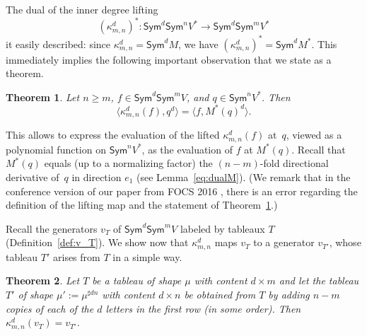 \documentclass[11pt]{amsart}
\def\Sym{\mathsf{Sym}}
\numberwithin{equation}{section}
\newtheorem{theorem}{Theorem}[section]
\begin{document}
The dual of the inner degree lifting
$$
 (\kappa^d_{m,n})^*\colon \Sym^d\Sym^n V^* \to \Sym^d\Sym^m V^*
$$
it easily described: since $\kappa^d_{m,n} =\Sym^d M$, we have 
$(\kappa^d_{m,n})^* =\Sym^d M^*$. 
This immediately implies the following important observation that we 
state as a theorem. 

\begin{theorem}\label{th:lift-ip-preserv}
Let $n\ge m$, $f\in\Sym^d\Sym^m V$, and $q\in\Sym^n V^*$. Then
$$
\big\langle \kappa^d_{m,n}(f), q^{d} \big\rangle = \big\langle f, M^*(q)^{d}\big\rangle .
$$ 
\end{theorem}

This allows to express the evaluation of the lifted $\kappa^d_{m,n}(f)$ at~$q$, 
viewed as a polynomial function on $\Sym^n V^*$, as the evaluation of $f$ at $M^*(q)$.
Recall that $M^*(q)$ equals (up to a normalizing factor) the $(n-m)$-fold directional derivative of~$q$ 
in direction $e_1$ (see Lemma~\ref{eq:dualM}). 
(We remark that 
in the conference version of our paper from FOCS 2016 \cite{BIP:16}, there is an error 
regarding the definition of the lifting map and the statement of Theorem~\ref{th:lift-ip-preserv}.)

Recall the generators $v_T$ of $\Sym^d\Sym^m V$ labeled by tableaux $T$
(Definition~\ref{def:v_T}).  
We show now that $\kappa^d_{m,n}$ %
maps $v_T$ to a generator $v_{T'}$, whose tableau $T'$ arises from $T$ 
in a simple way. 

\begin{theorem}\label{th:lifting-vT}
Let $T$ be a tableau of shape $\mu$ with content $d\times m$ and 
let the tableau $T'$ of shape $\mu':=\mu^{\sharp dn}$ %
with content $d\times n$ 
be obtained from $T$ by adding $n-m$ copies of each of the $d$ letters 
in the first row (in some order). 
Then $\kappa^d_{m,n} (v_T) = v_{T'}$.  
\end{theorem}
\end{document}
